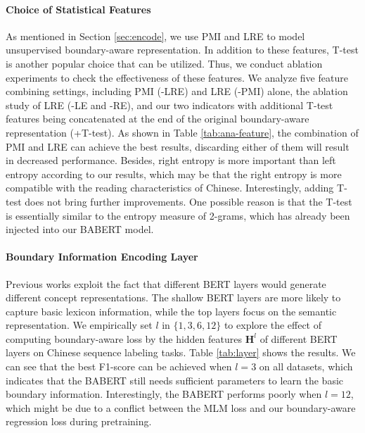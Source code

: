 \documentclass[11pt]{article}
\begin{document}
\begin{CJK}{UTF8}{gbsn}
\paragraph{Choice of Statistical Features}
As mentioned in Section \ref{sec:encode}, we use PMI and LRE to model unsupervised boundary-aware representation.
In addition to these features, T-test \cite{xiao-etal-2021-ernie} is another popular choice that can be utilized.
Thus, we conduct ablation experiments to check the effectiveness of these features.
We analyze five feature combining settings, including PMI (-LRE) and LRE (-PMI) alone, the ablation study of LRE (-LE and -RE), 
and our two indicators with additional T-test features being concatenated at the end of the original boundary-aware representation (+T-test).
As shown in Table \ref{tab:ana-feature}, the combination of PMI and LRE can achieve the best results,
discarding either of them will result in decreased performance.
Besides, right entropy is more important than left entropy according to our results,
which may be that the right entropy is more compatible with the reading characteristics of Chinese.
Interestingly, adding T-test does not bring further improvements.
One possible reason is that the T-test is essentially similar to the entropy measure of 2-grams,
which has already been injected into our BABERT model.


\paragraph{Boundary Information Encoding Layer}
Previous works \cite{jawahar2019does, liu-etal-2021-lexicon} exploit the fact that different BERT layers would generate different concept representations.
The shallow BERT layers are more likely to capture basic lexicon information,
while the top layers focus on the semantic representation.
We empirically set $l$ in $\{1, 3, 6, 12\}$ to explore the effect of computing boundary-aware loss by the hidden features $\mathbf{H}^l$ of different BERT layers on Chinese sequence labeling tasks.
Table \ref{tab:layer} shows the results.
We can see that the best F1-score can be achieved when $l=3$ on all datasets, 
 which indicates that the BABERT still needs sufficient parameters to learn the basic boundary information.
Interestingly, the BABERT performs poorly when $l=12$,
which might be due to a conflict between the MLM loss and our boundary-aware regression loss during pretraining.


\end{CJK}
\end{document}
